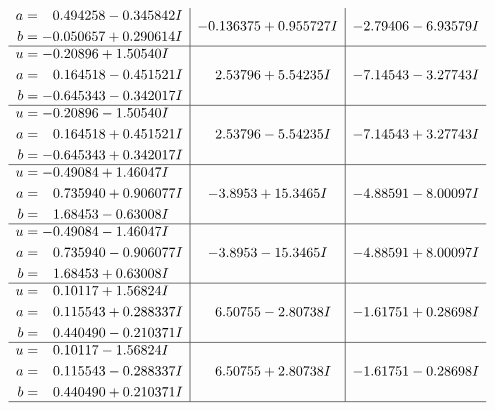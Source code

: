 \documentclass[1p]{elsarticle_modified}
\theoremstyle{definition}
\begin{document}
$$\begin{array}{c|c|c}
\begin{aligned}
a &= \phantom{-}0.494258 - 0.345842 I \\
b &= -0.050657 + 0.290614 I\end{aligned}
 & -0.136375 + 0.955727 I & -2.79406 - 6.93579 I \\ \hline\begin{aligned}
u &= -0.20896 + 1.50540 I \\
a &= \phantom{-}0.164518 - 0.451521 I \\
b &= -0.645343 - 0.342017 I\end{aligned}
 & \phantom{-}2.53796 + 5.54235 I & -7.14543 - 3.27743 I \\ \hline\begin{aligned}
u &= -0.20896 - 1.50540 I \\
a &= \phantom{-}0.164518 + 0.451521 I \\
b &= -0.645343 + 0.342017 I\end{aligned}
 & \phantom{-}2.53796 - 5.54235 I & -7.14543 + 3.27743 I \\ \hline\begin{aligned}
u &= -0.49084 + 1.46047 I \\
a &= \phantom{-}0.735940 + 0.906077 I \\
b &= \phantom{-}1.68453 - 0.63008 I\end{aligned}
 & -3.8953 + 15.3465 I & -4.88591 - 8.00097 I \\ \hline\begin{aligned}
u &= -0.49084 - 1.46047 I \\
a &= \phantom{-}0.735940 - 0.906077 I \\
b &= \phantom{-}1.68453 + 0.63008 I\end{aligned}
 & -3.8953 - 15.3465 I & -4.88591 + 8.00097 I \\ \hline\begin{aligned}
u &= \phantom{-}0.10117 + 1.56824 I \\
a &= \phantom{-}0.115543 + 0.288337 I \\
b &= \phantom{-}0.440490 - 0.210371 I\end{aligned}
 & \phantom{-}6.50755 - 2.80738 I & -1.61751 + 0.28698 I \\ \hline\begin{aligned}
u &= \phantom{-}0.10117 - 1.56824 I \\
a &= \phantom{-}0.115543 - 0.288337 I \\
b &= \phantom{-}0.440490 + 0.210371 I\end{aligned}
 & \phantom{-}6.50755 + 2.80738 I & -1.61751 - 0.28698 I\\
 \hline 
 \end{array}$$\newpage\newpage\renewcommand{\arraystretch}{1}
\end{document}
